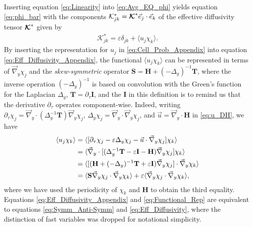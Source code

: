 \documentclass[11pt]{amsart}
\newcommand{\Tb}{\mathbf{T}}
\newcommand{\Hb}{\mathbf{H}}
\newcommand{\Ib}{\mathbf{I}}
\newcommand{\Sb}{\mathbf{S}}
\newcommand{\Kc}{\mathcal{K}}
\newcommand\Kbc{\mbox{\boldmath${\mathcal{K}}$}}
\begin{document}
Inserting equation \eqref{eq:Linearity} into \eqref{eq:Avg_EQ_phi}
yields equation \eqref{eq:phi_bar} with the components
$\Kc^*_{jk}=\Kbc^*\vec{e}_j\cdot\vec{e}_k$ of the effective diffusivity
tensor $\Kbc^*$ given by 
%
\begin{align}\label{eq:Eff_Diffusivity_Appendix}
  \Kc^*_{jk}=\varepsilon\delta_{jk}+\langle u_j\chi_k\rangle.
\end{align}
%
By inserting the representation for $u_j$ in
\eqref{eq:Cell_Prob_Appendix} into equation
\eqref{eq:Eff_Diffusivity_Appendix}, the functional $\langle u_j\chi_k\rangle$ can be
represented in terms of $\vec{\nabla}_y\chi_j$ and the \emph{skew-symmetric}
operator $\Sb=\Hb+(-\Delta_y)^{-1}\Tb$, where the inverse operation $(-\Delta_y)^{-1}$
is based on convolution with the Green's function for the Laplacian
$\Delta_y$, $\Tb=\partial_\tau\Ib$, and the $\Ib$ in this definition is to remind us
that the derivative $\partial_\tau$ operates component-wise. Indeed, writing  
$\partial_\tau\chi_j
=\vec{\nabla}_y\cdot(\Delta_y^{-1}\Tb)\vec{\nabla}_y\chi_j$,
$\Delta_y\chi_j=\vec{\nabla}_y\cdot\vec{\nabla}_y\chi_j$, and $\vec{u}=\vec{\nabla}_y\cdot\Hb$ in
\eqref{eq:u_DH}, we have    
%
\begin{align}\label{eq:Functional_Rep}
  \langle u_j\chi_k\rangle&=\langle[\partial_\tau\chi_j-\varepsilon\Delta_y\chi_j-\vec{u}\cdot\vec{\nabla}_y\chi_j]\chi_k\rangle
       \\
       &=\langle\vec{\nabla}_y\cdot[(\Delta_y^{-1}\Tb-\varepsilon\Ib-\Hb)\vec{\nabla}_y\chi_j]\chi_k\rangle
       \notag\\
       &=\langle[(\Hb+(-\Delta_y)^{-1}\Tb+\varepsilon\Ib)\vec{\nabla}_y\chi_j]\cdot\vec{\nabla}_y\chi_k\rangle
       \notag\\
       &=\langle\Sb\vec{\nabla}_y\chi_j\cdot\vec{\nabla}_y\chi_k\rangle+\varepsilon\langle\vec{\nabla}_y\chi_j\cdot\vec{\nabla}_y\chi_k\rangle,
       \notag
\end{align}
%
where we have used the periodicity of $\chi_k$ and $\Hb$ to obtain the
third equality. Equations \eqref{eq:Eff_Diffusivity_Appendix} and
\eqref{eq:Functional_Rep} are equivalent to equations
\eqref{eq:Symm_Anti-Symm} and \eqref{eq:Eff_Diffusivity}, where the
distinction of fast variables was dropped for notational simplicity. 
\end{document}
